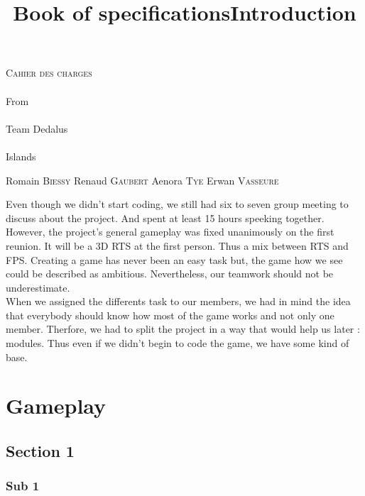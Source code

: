 \documentclass[article]{report} %
\title {Book of specifications}
\begin{document}
		\thispagestyle{empty}
  			\begin{titlepage} 
						\vspace*{5cm} 
  					\begin{center} 
  							{\huge{\textsc{Cahier des charges} \\ ~ \\{\large From}\\ ~\\ Team Dedalus \\ ~ \\ Islands}}
	  						\vspace*{11cm}
						\end{center}
  					\hfill {\large Romain \textsc{Biessy}}
  					\hfill {\large Renaud \textsc{Gaubert}}
  					\hfill {\large Aenora \textsc{Tye}}
  					\hfill {\large Erwan  \textsc{Vasseure}}
  			\end{titlepage} 
  	\renewcommand{\contentsname}{Table of contents}

  	\tableofcontents
  			\newpage
				\title{Introduction}%
								Even though we didn't start coding, we still had six to seven group meeting to discuss about the project. And spent at least 15 hours speeking together.\newline
								However, the project's general gameplay was fixed unanimously on the first reunion. It will be a 3D RTS at the first person. Thus a mix between RTS and FPS. Creating a game has never been an easy task but, the game how we see could be described as ambitious. Nevertheless, our teamwork should not be underestimate.\\
								
								When we assigned the differents task to our members, we had in mind the idea that everybody should know how most of the game works and not only one member. Therfore, we had to split the project in a way that would help us later : modules. Thus even if we didn't begin to code the game, we have some kind of base. 								
								
  			\chapter{Gameplay}
						\section{Section 1}
							  \subsection{Sub 1}
\end{document}
